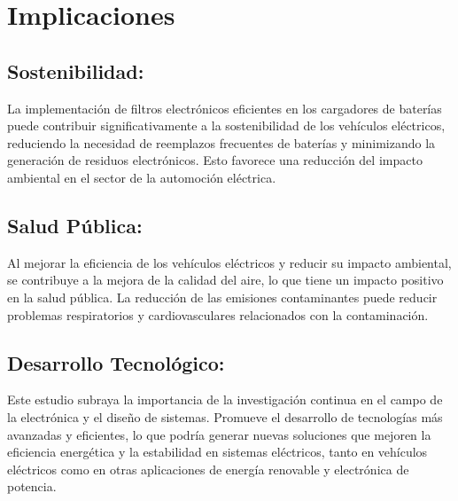 \section*{Implicaciones}

\subsection*{Sostenibilidad:}
La implementación de filtros electrónicos eficientes en los cargadores de baterías puede contribuir significativamente a la sostenibilidad de los vehículos eléctricos, reduciendo la necesidad de reemplazos frecuentes de baterías y minimizando la generación de residuos electrónicos. Esto favorece una reducción del impacto ambiental en el sector de la automoción eléctrica.

\subsection*{Salud Pública:}
Al mejorar la eficiencia de los vehículos eléctricos y reducir su impacto ambiental, se contribuye a la mejora de la calidad del aire, lo que tiene un impacto positivo en la salud pública. La reducción de las emisiones contaminantes puede reducir problemas respiratorios y cardiovasculares relacionados con la contaminación.

\subsection*{Desarrollo Tecnológico:}
Este estudio subraya la importancia de la investigación continua en el campo de la electrónica y el diseño de sistemas. Promueve el desarrollo de tecnologías más avanzadas y eficientes, lo que podría generar nuevas soluciones que mejoren la eficiencia energética y la estabilidad en sistemas eléctricos, tanto en vehículos eléctricos como en otras aplicaciones de energía renovable y electrónica de potencia.